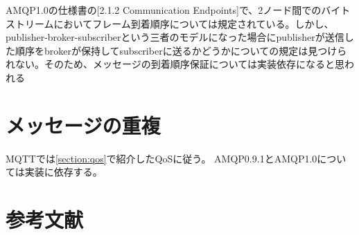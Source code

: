 \documentclass[uplatex, twocolumn,10pt]{jsarticle}
\begin{document}
AMQP1.0の仕様書\cite{amqpcore25:online}の[2.1.2 Communication Endpoints]で、2ノード間でのバイトストリームにおいてフレーム到着順序については規定されている。しかし、publisher-broker-subscriberという三者のモデルになった場合にpublisherが送信した順序をbrokerが保持してsubscriberに送るかどうかについての規定は見つけられない。そのため、メッセージの到着順序保証については実装依存になると思われる

\section{メッセージの重複}

MQTTでは\ref{section:qos}で紹介したQoSに従う。
AMQP0.9.1とAMQP1.0については実装に依存する。

\section{参考文献}



\end{document}
